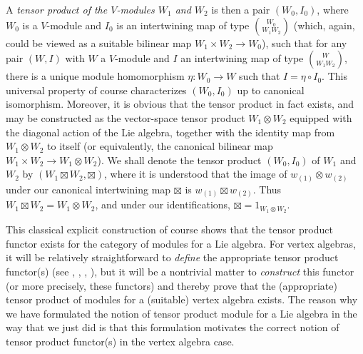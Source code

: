 \documentclass[12pt]{article}
\begin{document}
A {\it tensor product of the $V$-modules $W_1$ and $W_2$} is then a
pair $(W_0,I_0)$, where $W_0$ is a $V$-module and $I_0$ is an
intertwining map of type ${W_0 \choose {W_1 W_2}}$ (which, again,
could be viewed as a suitable bilinear map $W_1 \times W_2
\longrightarrow W_0$), such that for any pair $(W,I)$ with $W$ a
$V$-module and $I$ an intertwining map of type ${W \choose {W_1
W_2}}$, there is a unique module homomorphism $\eta:
W_0\longrightarrow W$ such that $I=\eta \circ I_0$. This universal
property of course characterizes $(W_0, I_0)$ up to canonical
isomorphism.  Moreover, it is obvious that the tensor product in fact
exists, and may be constructed as the vector-space tensor product
$W_1\otimes W_2$ equipped with the diagonal action of the Lie algebra,
together with the identity map {}from $W_1\otimes W_2$ to itself (or
equivalently, the canonical bilinear map $W_1 \times W_2
\longrightarrow W_1 \otimes W_2$).  We shall denote the tensor product
$(W_0,I_0)$ of $W_1$ and $W_2$ by $(W_1 \boxtimes W_2, \boxtimes)$,
where it is understood that the image of $w_{(1)}\otimes w_{(2)}$
under our canonical intertwining map $\boxtimes$ is $w_{(1)}\boxtimes
w_{(2)}$.  Thus $W_1 \boxtimes W_2=W_1\otimes W_2$, and under our
identifications, $\boxtimes = 1_{W_1\otimes W_2}$.

\begin{rema}
{\rm This classical explicit construction of course shows that the
tensor product functor exists for the category of modules for a Lie
algebra.  For vertex algebras, it will be relatively straightforward
to {\it define} the appropriate tensor product functor(s) (see
\cite{tensorK}, \cite{tensor1}, \cite{tensor2}, \cite{tensor3}), but
it will be a nontrivial matter to {\it construct} this functor (or
more precisely, these functors) and thereby prove that the
(appropriate) tensor product of modules for a (suitable) vertex
algebra exists.  The reason why we have formulated the notion of
tensor product module for a Lie algebra in the way that we just did is
that this formulation motivates the correct notion of tensor product
functor(s) in the vertex algebra case.}
\end{rema}
\end{document}
